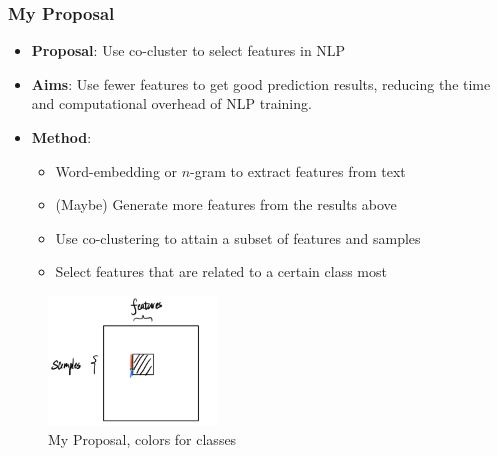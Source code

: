 \documentclass[11pt]{beamer}
\begin{document}
\begin{frame}
    \frametitle{My Proposal}
    \begin{itemize}
        \item \textbf{Proposal}: Use co-cluster to select features in NLP
        \item \textbf{Aims}: Use fewer features to get good prediction results, reducing the time and computational overhead of NLP training.
        \item \textbf{Method}:
              \begin{itemize}
                  \item Word-embedding or $n$-gram to extract features from text
                  \item (Maybe) Generate more features from the results above
                  \item Use co-clustering to attain a subset of features and samples
                  \item Select features that are related to a certain class most
              \end{itemize}

    \end{itemize}
    \begin{figure}[htbp]
        \centering
        \includegraphics[width=0.4\textwidth]{mypro.jpeg}
        \caption{My Proposal, colors for classes}
    \end{figure}
\end{frame}

\end{document}
